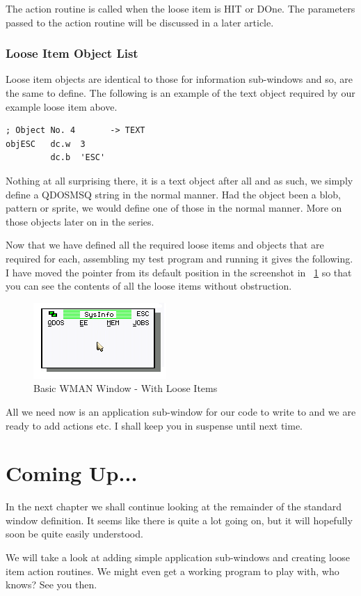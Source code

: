 The action routine is called when the loose item is HIT or DOne. The parameters
passed to the action routine will be discussed in a later article.

\subsubsection{Loose Item Object List}
\label{ch23-loose-objects}%

Loose item objects are identical to those for information sub-{}windows and so, are
the same to define. The following is an example of the text object required by our example
loose item above.

\begin{lstlisting}[firstnumber=last,caption={WMAN Example Window - Loose Item Object Text}]
; Object No. 4       -> TEXT  
objESC   dc.w  3
         dc.b  'ESC'
\end{lstlisting}

Nothing at all surprising there, it is a text object after all and as such, we
simply define a QDOSMSQ string in the normal manner. Had the object been a blob, pattern
or sprite, we would define one of those in the normal manner. More on those objects later
on in the series.

Now that we have defined all the required loose items and objects that are required
for each, assembling my test program and running it gives the following. I have moved the
pointer from its default position in the screenshot in \figurename~\ref{fig:FirstWindowInAction4} so that you can see the contents of
all the loose items without obstruction.

\begin{figure}[h]
\center
\includegraphics{Content/images/SystemInfo_4.png}
\caption{Basic WMAN Window - With Loose Items}
\label{fig:FirstWindowInAction4}
\end{figure}

All we need now is an application sub-{}window for our code to write to and we are
ready to add actions etc. I shall keep you in suspense until next time.

\section{Coming Up...}
\label{ch23-the-end}%

In the next chapter we shall continue looking at the remainder of the
standard window definition. It seems like there is quite a lot going on, but it will
hopefully soon be quite easily understood.

We will take a look at adding simple application sub-{}windows and
creating loose item action routines. We might even get a working program to play with, who
knows? See you then.

